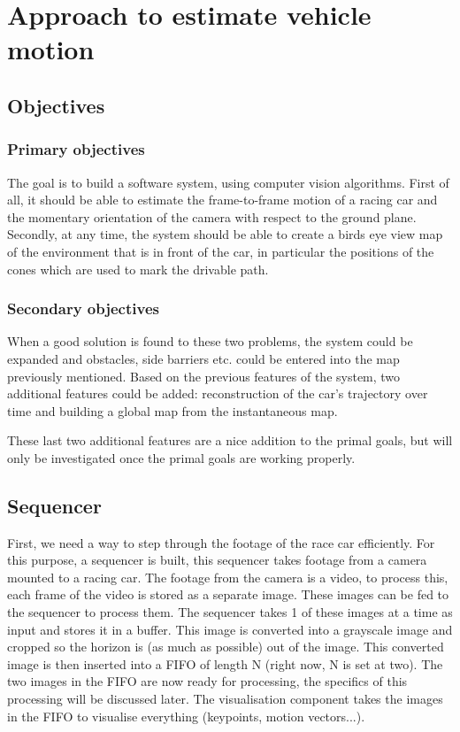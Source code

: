 \chapter{Approach to estimate vehicle motion}

\section{Objectives}
\subsection{Primary objectives}
The goal is to build a software system, using computer vision algorithms. First of all, it should be able to estimate the frame-to-frame motion of a racing car and the momentary orientation of the camera with respect to the ground plane. Secondly, at any time, the system should be able to create a birds eye view map of the environment that is in front of the car, in particular the positions of the cones which are used to mark the drivable path.\bigskip 

\subsection{Secondary objectives}
When a good solution is found to these two problems, the system could be expanded and obstacles, side barriers etc. could be entered into the map previously mentioned. Based on the previous features of the system, two additional features could be added: reconstruction of the car's trajectory over time and building a global map from the instantaneous map.\bigskip

These last two additional features are a nice addition to the primal goals, but will only be investigated once the primal goals are working properly.

\section{Sequencer}
First, we need a way to step through the footage of the race car efficiently. For this purpose, a sequencer is built, this sequencer takes footage from a camera mounted to a racing car. The footage from the camera is a video, to process this, each frame of the video is stored as a separate image. These images can be fed to the sequencer to process them. The sequencer takes 1 of these images at a time as input and stores it in a buffer. This image is converted into a grayscale image and cropped so the horizon is (as much as possible) out of the image. This converted image is then inserted into a FIFO of length N (right now, N is set at two). The two images in the FIFO are now ready for processing, the specifics of this processing will be discussed later. The visualisation component takes the images in the FIFO to visualise everything (keypoints, motion vectors...).\bigskip

